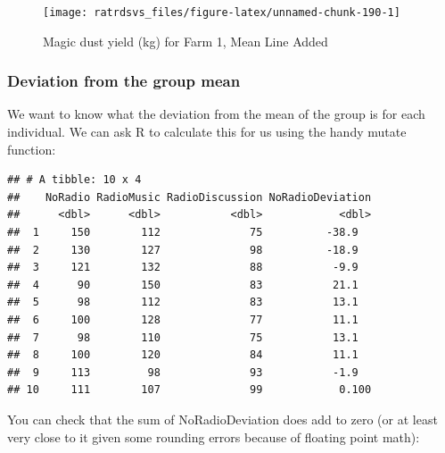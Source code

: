 \documentclass[
]{book}
\newenvironment{Shaded}{\begin{snugshade}}{\end{snugshade}}
\newcommand{\DataTypeTok}[1]{\textcolor[rgb]{0.13,0.29,0.53}{#1}}
\newcommand{\KeywordTok}[1]{\textcolor[rgb]{0.13,0.29,0.53}{\textbf{#1}}}
\newcommand{\NormalTok}[1]{#1}
\newcommand{\OperatorTok}[1]{\textcolor[rgb]{0.81,0.36,0.00}{\textbf{#1}}}
\newcommand{\StringTok}[1]{\textcolor[rgb]{0.31,0.60,0.02}{#1}}
\begin{document}
\begin{figure}

{\centering \texttt{[image: ratrdsvs\_files/figure-latex/unnamed-chunk-190-1]} 

}

\caption{Magic dust yield (kg) for Farm 1, Mean Line Added}\label{fig:unnamed-chunk-190}
\end{figure}

\hypertarget{deviation-from-the-group-mean}{%
\subsubsection{Deviation from the group mean}\label{deviation-from-the-group-mean}}

We want to know what the deviation from the mean of the group is for each individual. We can ask R to calculate this for us using the handy mutate function:

\begin{Shaded}
\end{Shaded}

\begin{verbatim}
## # A tibble: 10 x 4
##    NoRadio RadioMusic RadioDiscussion NoRadioDeviation
##      <dbl>      <dbl>           <dbl>            <dbl>
##  1     150        112              75          -38.9  
##  2     130        127              98          -18.9  
##  3     121        132              88           -9.9  
##  4      90        150              83           21.1  
##  5      98        112              83           13.1  
##  6     100        128              77           11.1  
##  7      98        110              75           13.1  
##  8     100        120              84           11.1  
##  9     113         98              93           -1.9  
## 10     111        107              99            0.100
\end{verbatim}

You can check that the sum of NoRadioDeviation does add to zero (or at least very close to it given some rounding errors because of floating point math):

\begin{Shaded}
\end{Shaded}
\end{document}
